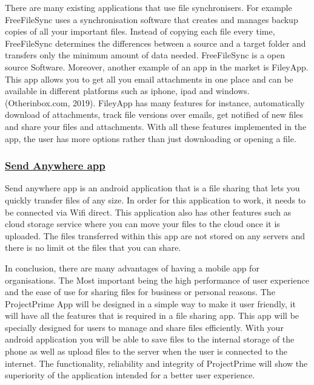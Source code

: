 \documentclass{article}
\begin{document}
There are many existing applications that use file synchronisers. For example FreeFileSync uses a synchronisation software that creates and manages backup copies of all your important files. Instead of copying each file every time, FreeFileSync determines the differences between a source and a target folder and transfers only the minimum amount of data needed. FreeFileSync is a open source Software. Moreover, another example of an app in the market is FileyApp. This app allows you to get all you email attachments in one place and can be available in different platforms such as iphone, ipad and windows. (Otherinbox.com, 2019).  FileyApp has many features for instance, automatically download of attachments, track file versions over emails, get notified of new files and share your files and attachments. With all these features implemented in the app, the user has more options rather than just downloading or opening a file.

\subsubsection{\underline{Send Anywhere app}}

Send anywhere app is an android application that  is a file sharing that lets you quickly transfer files of any size. In order for this application to work, it needs to be connected via Wifi direct. This application also has other features such as cloud storage service where you can move your files to the cloud once it is uploaded. The files transferred within this app are not stored on any servers and there is no limit ot the files that you can share.

In conclusion, there are many advantages of having a mobile app for organisations. The Most important being the high performance of user experience and the ease of use for sharing files for business or personal reasons. The ProjectPrime App will be designed in a simple way to make it user friendly, it will have all the features that is required in a file sharing app. This app will be specially designed for users to manage and share files efficiently. With your android application you will be able to save files to the internal storage of the phone as well as upload files to the server when the user is connected to the internet. The functionality, reliability and integrity of ProjectPrime will show the superiority of the application intended for a better user experience.
\end{document}
